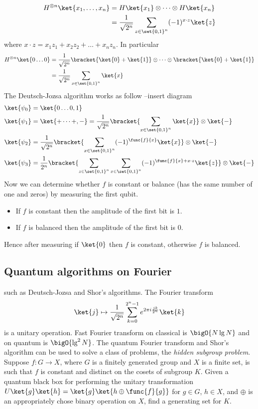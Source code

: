 \begin{align*}
    H^{\otimes n} \ket{x_1, \dots, x_n} &= H \ket{x_1} \otimes \dots \otimes H \ket{x_n}\\
    &= \dfrac{1}{\sqrt{2^n}} \sum_{z \in \set{0,1}^n} (-1)^{x \cdot z} \ket{z}
\end{align*}
where \(x \cdot z = x_1z_1 + x_2 z_2 + \dots + x_n z_n\). In particular 
\begin{align*}
    H^{\otimes n} \ket{0 \dots 0} &= \dfrac{1}{\sqrt{2^n}} \bracket{ \ket{0}  + \ket{1}} \otimes \dots \otimes \bracket{\ket{0} + \ket{1}}\\
    &= \dfrac{1}{\sqrt{2^n}} \sum_{x \in \set{0,1}^n} \ket{x}\\
\end{align*}
The Deutsch-Jozsa algorithm works as follow --insert diagram 
\begin{align*}
    \ket{\psi_0} &= \ket{0\dots 0, 1}\\
    \ket{\psi_1} &= \ket{+ \dots +, -} = \dfrac{1}{\sqrt{2^n}} \bracket{\sum_{x \in \set{0,1}^n} \ket{x} } \otimes \ket{-}\\ 
    \ket{\psi_2} &= \dfrac{1}{\sqrt{2^n}} \bracket{\sum_{x \in \set{0,1}^n} (-1)^{\func{f}{x}}\ket{x} } \otimes \ket{-}\\
    \ket{\psi_3} &= \dfrac{1}{2^n} \bracket{\sum_{z \in \set{0,1}^n} \sum_{x \in \set{0,1}^n}  (-1)^{\func{f}{x} + x \cdot z} \ket{z}} \otimes \ket{-}
\end{align*}
Now we can determine whether \(f\) is constant or balance (has the same number of one and zeros) by measuring the first qubit. 
\begin{itemize}
    \item If \(f\) is constant then the amplitude of the first bit is \(1\).
    \item If \(f\) is balanced then the amplitude of the first bit is \(0\).
\end{itemize}
Hence after measuring if \(\ket{0}\) then \(f\) is constant, otherwise \(f\) is balanced. 


\subsection{Quantum algorithms on Fourier}
such as Deutsch-Jozsa and Shor's algorithms. The Fourier transform
\begin{equation*}
    \ket{j} \mapsto \dfrac{1}{\sqrt{2^n}} \sum_{k = 0}^{2^n - 1} e^{2\pi i \frac{jk}{2^n}} \ket{k}
\end{equation*}
is a unitary operation. Fast Fourier transform on classical is \(\bigO{N \lg N}\) and on quantum is \(\bigO{\lg^2 N}\). The quantum Fourier transform and Shor's algorithm can be used to solve a class of problems, the \textit{hidden subgroup problem}. Suppose \(f: G \to X\), where \(G\) is a finitely generated group and \(X\) is a finite set, is such that \(f\) is constant and distinct on the cosets of subgroup \(K\). Given a quantum black box for performing the unitary transformation \(U \ket{g} \ket{h} = \ket{g} \ket{h \oplus \func{f}{g}}\) for \(g \in G\), \(h \in X\), and \(\oplus\) is an appropriately chose binary operation on \(X\), find a generating set for \(K\).

